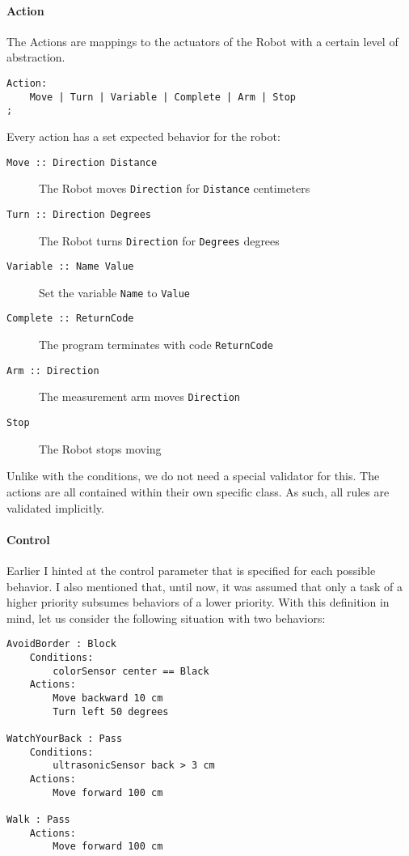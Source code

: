 \documentclass{scrartcl}
\begin{document}
\paragraph{Action}
The Actions are mappings to the actuators of the Robot with a certain level of abstraction.
\begin{verbatim}
Action:
	Move | Turn | Variable | Complete | Arm | Stop
;
\end{verbatim}
Every action has a set expected behavior for the robot:
\begin{description}
	\item[\texttt{Move :: Direction Distance}] The Robot moves \texttt{Direction} for \texttt{Distance} centimeters
	\item[\texttt{Turn :: Direction Degrees}] The Robot turns \texttt{Direction} for \texttt{Degrees} degrees
	\item[\texttt{Variable :: Name Value}] Set the variable \texttt{Name} to \texttt{Value}
	\item[\texttt{Complete :: ReturnCode}] The program terminates with code \texttt{ReturnCode}
	\item[\texttt{Arm :: Direction}] The measurement arm moves \texttt{Direction}
	\item[\texttt{Stop}] The Robot stops moving
\end{description}

Unlike with the conditions, we do not need a special validator for this.
The actions are all contained within their own specific class.
As such, all rules are validated implicitly.

\paragraph{Control}
Earlier I hinted at the control parameter that is specified for each possible behavior.
I also mentioned that, until now, it was assumed that only a task of a higher priority subsumes behaviors of a lower priority.
With this definition in mind, let us consider the following situation with two behaviors:
\begin{verbatim}
AvoidBorder : Block
	Conditions:
		colorSensor center == Black
	Actions:
		Move backward 10 cm
		Turn left 50 degrees

WatchYourBack : Pass
	Conditions:
		ultrasonicSensor back > 3 cm
	Actions:
		Move forward 100 cm

Walk : Pass
	Actions:
		Move forward 100 cm
\end{verbatim}
\end{document}
